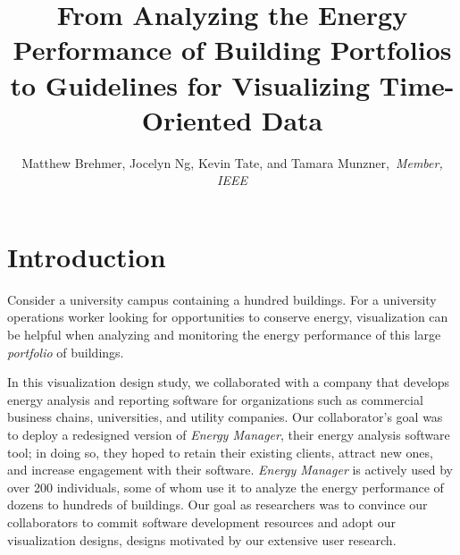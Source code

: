 \documentclass[journal]{vgtc}                %
\title{From Analyzing the Energy Performance of Building Portfolios to Guidelines for Visualizing Time-Oriented Data}
\author{Matthew Brehmer, Jocelyn Ng, Kevin Tate, and Tamara Munzner,~\textit{Member, IEEE}}
\begin{document}

\maketitle



\section{Introduction}
\label{introduction}


Consider a university campus containing a hundred buildings. 
For a university operations worker looking for opportunities to conserve energy, visualization can be helpful when analyzing and monitoring the energy performance of this large {\it portfolio} of buildings. 

In this visualization design study, we collaborated with a company that develops energy analysis and reporting software for organizations such as commercial business chains, universities, and utility companies.
Our collaborator's goal was to deploy a redesigned version of {\it Energy Manager}, their energy analysis software tool; in doing so, they hoped to retain their existing clients, attract new ones, and increase engagement with their software. 
{\it Energy Manager} is actively used by over 200 individuals, some of whom use it to analyze the energy performance of dozens to hundreds of buildings.
Our goal as researchers was to convince our collaborators to commit software development resources and adopt our visualization designs, designs motivated by our extensive user research.
\end{document}
